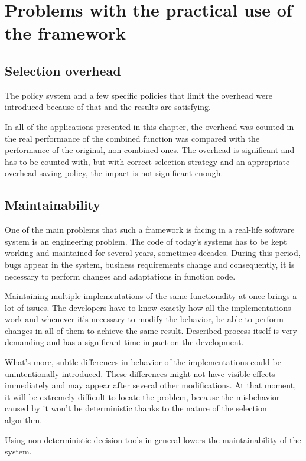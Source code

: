 \section{Problems with the practical use of the framework}

\subsection{Selection overhead}

The policy system and a few specific policies that limit the overhead were introduced because of that and the results are satisfying.

In all of the applications presented in this chapter, the overhead was counted in - the real performance of the combined function was compared with the performance of the original, non-combined ones. The overhead is significant and has to be counted with, but with correct selection strategy and an appropriate overhead-saving policy, the impact is not significant enough.

\subsection{Maintainability}

One of the main problems that such a framework is facing in a real-life software system is an engineering problem. The code of today's systems has to be kept working and maintained for several years, sometimes decades. During this period, bugs appear in the system, business requirements change and consequently, it is necessary to perform changes and adaptations in function code.

Maintaining multiple implementations of the same functionality at once brings a lot of issues. The developers have to know exactly how all the implementations work and whenever it's necessary to modify the behavior, be able to perform changes in all of them to achieve the same result. Described process itself is very demanding and has a significant time impact on the development. 

What's more, subtle differences in behavior of the implementations could be unintentionally introduced. These differences might not have visible effects immediately and may appear after several other modifications. At that moment, it will be extremely difficult to locate the problem, because the misbehavior caused by it won't be deterministic thanks to the nature of the selection algorithm.

Using non-deterministic decision tools in general lowers the maintainability of the system.

